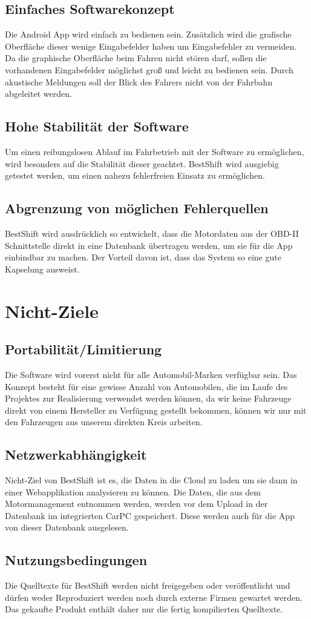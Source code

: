 \subsection{Einfaches Softwarekonzept}
Die Android App wird einfach zu bedienen sein. Zusätzlich wird die grafische Oberfläche dieser wenige Eingabefelder haben um Eingabefehler zu vermeiden.
Da die graphische Oberfläche beim Fahren nicht stören darf, sollen die vorhandenen Eingabefelder möglichst groß und leicht zu bedienen sein. Durch akustische Meldungen soll der Blick des Fahrers nicht von der Fahrbahn abgeleitet werden.
\subsection{Hohe Stabilität der Software}
Um einen reibungslosen Ablauf im Fahrbetrieb mit der Software zu ermöglichen, wird besonders auf die Stabilität dieser geachtet. BestShift wird ausgiebig getestet werden, um einen nahezu fehlerfreien Einsatz zu ermöglichen.
\subsection{Abgrenzung von möglichen Fehlerquellen}
BestShift wird ausdrücklich so entwickelt, dass die Motordaten aus der OBD-II Schnittstelle direkt in eine Datenbank übertragen werden, um sie für die App einbindbar zu machen. Der Vorteil davon ist, dass das System so eine gute Kapselung ausweist.

\section{Nicht-Ziele}
\subsection{Portabilität/Limitierung}
Die Software wird vorerst nicht für alle Automobil-Marken verfügbar sein. Das Konzept besteht für eine gewisse Anzahl von Automobilen, die im Laufe des Projektes zur Realisierung verwendet werden können, da wir keine Fahrzeuge direkt von einem Hersteller zu Verfügung gestellt bekommen, können wir nur mit den Fahrzeugen aus unserem direkten Kreis arbeiten. 
\subsection{Netzwerkabhängigkeit}
Nicht-Ziel von BestShift ist es, die Daten in die Cloud zu laden um sie dann in einer Webapplikation analysieren zu können. Die Daten, die aus dem Motormanagement entnommen werden, werden vor dem Upload in der Datenbank im integrierten CarPC gespeichert. Diese werden auch für die App von dieser Datenbank ausgelesen.
\subsection{Nutzungsbedingungen}
Die Quelltexte für BestShift werden nicht freigegeben oder veröffentlicht und dürfen weder Reproduziert werden noch durch externe Firmen gewartet werden. Das gekaufte Produkt enthält daher nur die fertig kompilierten Quelltexte.